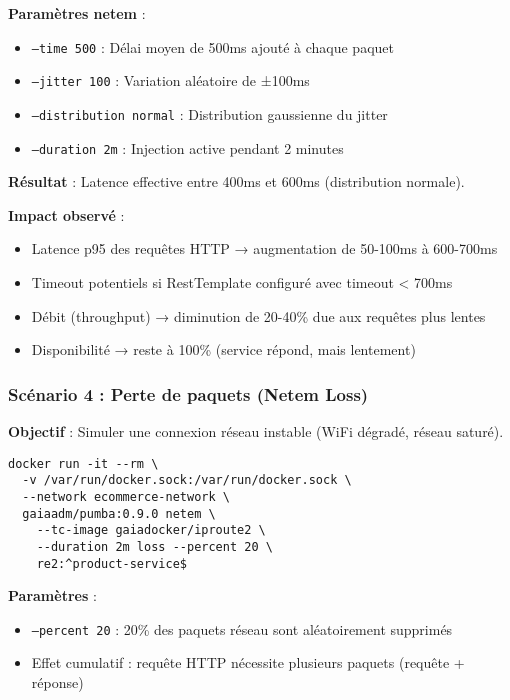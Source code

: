\textbf{Paramètres netem} :
\begin{itemize}
    \item \texttt{--time 500} : Délai moyen de 500ms ajouté à chaque paquet
    \item \texttt{--jitter 100} : Variation aléatoire de ±100ms
    \item \texttt{--distribution normal} : Distribution gaussienne du jitter
    \item \texttt{--duration 2m} : Injection active pendant 2 minutes
\end{itemize}

\textbf{Résultat} : Latence effective entre 400ms et 600ms (distribution normale).

\textbf{Impact observé} :
\begin{itemize}
    \item Latence p95 des requêtes HTTP → augmentation de 50-100ms à 600-700ms
    \item Timeout potentiels si RestTemplate configuré avec timeout < 700ms
    \item Débit (throughput) → diminution de 20-40\% due aux requêtes plus lentes
    \item Disponibilité → reste à 100\% (service répond, mais lentement)
\end{itemize}

\subsubsection{Scénario 4 : Perte de paquets (Netem Loss)}

\textbf{Objectif} : Simuler une connexion réseau instable (WiFi dégradé, réseau saturé).

\begin{lstlisting}[caption={Commande Pumba - Perte 20\% de paquets}]
docker run -it --rm \
  -v /var/run/docker.sock:/var/run/docker.sock \
  --network ecommerce-network \
  gaiaadm/pumba:0.9.0 netem \
    --tc-image gaiadocker/iproute2 \
    --duration 2m loss --percent 20 \
    re2:^product-service$
\end{lstlisting}

\textbf{Paramètres} :
\begin{itemize}
    \item \texttt{--percent 20} : 20\% des paquets réseau sont aléatoirement supprimés
    \item Effet cumulatif : requête HTTP nécessite plusieurs paquets (requête + réponse)
\end{itemize}


